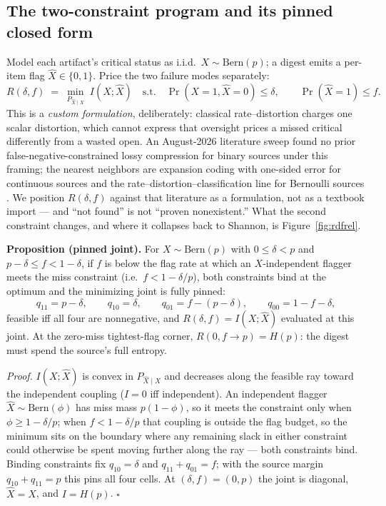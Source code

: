 \documentclass[11pt,a4paper]{article}
\begin{document}
\subsection{The two-constraint program and its pinned closed form}\label{sec:rdf}
Model each artifact's critical status as i.i.d.\ $X\sim\mathrm{Bern}(p)$; a digest emits a per-item flag $\hat X\in\{0,1\}$. Price the two failure modes separately:
\[
R(\delta,f)\;=\;\min_{P_{\hat X\mid X}}\; I(X;\hat X)
\quad\text{s.t.}\quad
\Pr(X{=}1,\hat X{=}0)\le\delta,
\qquad
\Pr(\hat X{=}1)\le f .
\]
This is a \emph{custom formulation}, deliberately: classical rate--distortion charges one scalar distortion, which cannot express that oversight prices a missed critical differently from a wasted open. An August-2026 literature sweep found no prior false-negative-constrained lossy compression for binary sources under this framing; the nearest neighbors are expansion coding with one-sided error for continuous sources \cite{expansion} and the rate--distortion--classification line for Bernoulli sources \cite{rdc}. We position $R(\delta,f)$ against that literature as a formulation, not as a textbook import --- and ``not found'' is not ``proven nonexistent.'' What the second constraint changes, and where it collapses back to Shannon, is Figure~\ref{fig:rdfrel}.



\begin{thebox}
\textbf{Proposition (pinned joint).} For $X\sim\mathrm{Bern}(p)$ with $0\le\delta<p$ and $p-\delta\le f<1-\delta$, if $f$ is below the flag rate at which an $X$-independent flagger meets the miss constraint (i.e.\ $f<1-\delta/p$), both constraints bind at the optimum and the minimizing joint is fully pinned:
\[
q_{11}=p-\delta,\qquad q_{10}=\delta,\qquad q_{01}=f-(p-\delta),\qquad q_{00}=1-f-\delta,
\]
feasible iff all four are nonnegative, and $R(\delta,f)=I(X;\hat X)$ evaluated at this joint. At the zero-miss tightest-flag corner, $R(0,f{\to}p)=H(p)$: the digest must spend the source's full entropy.

\emph{Proof.} $I(X;\hat X)$ is convex in $P_{\hat X\mid X}$ and decreases along the feasible ray toward the independent coupling ($I=0$ iff independent). An independent flagger $\hat X\sim\mathrm{Bern}(\phi)$ has miss mass $p(1-\phi)$, so it meets the constraint only when $\phi\ge 1-\delta/p$; when $f<1-\delta/p$ that coupling is outside the flag budget, so the minimum sits on the boundary where any remaining slack in either constraint could otherwise be spent moving further along the ray --- both constraints bind. Binding constraints fix $q_{10}=\delta$ and $q_{11}+q_{01}=f$; with the source margin $q_{10}+q_{11}=p$ this pins all four cells. At $(\delta,f)=(0,p)$ the joint is diagonal, $\hat X=X$, and $I=H(p)$. $\square$
\end{thebox}
\end{document}
